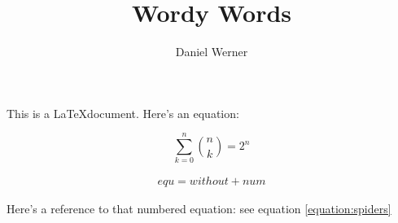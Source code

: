 \documentclass{article}
\title{Wordy Words}
\author{Daniel Werner}
\begin{document}
\maketitle

This is a \LaTeX document. Here's an equation:

\begin{equation}
    \label{equation:spiders}
    \sum_{k=0}^n \left. n \choose k \right. = 2^n
\end{equation}

\begin{align*}
    equ = without + num
\end{align*}

Here's a reference to that numbered equation: 
see equation \ref{equation:spiders} 
\end{document}
